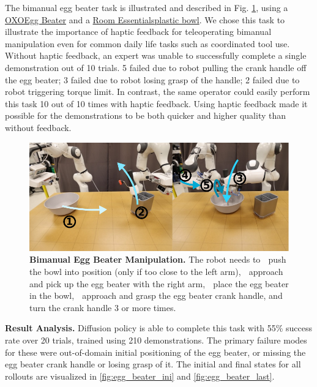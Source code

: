 The bimanual egg beater task is illustrated and described in Fig. \ref{fig:real_egg_beater}, using a
\href{https://www.oxo.com/egg-beater.html}{OXO\legalTM Egg Beater} and a
\href{https://www.target.com/p/114oz-plastic-serving-bowl-jet-gray-room-essentials-8482/-/A-86701588}{Room Essentials\legalTM plastic bowl}. We chose this task to illustrate the importance of haptic feedback for teleoperating bimanual manipulation even for common daily life tasks such as coordinated tool use. Without haptic feedback, an expert was unable to successfully complete a single demonstration out of 10 trials. 5 failed due to robot pulling the crank handle off the egg beater; 3 failed due to robot losing grasp of the handle; 2 failed due to robot triggering torque limit. In contrast, the same operator could easily perform this task 10 out of 10 times with haptic feedback. Using haptic feedback made it possible for the demonstrations to be both quicker and higher quality than without feedback.

\begin{figure}[t]
\centering
\includegraphics[width=\linewidth]{figure/real_egg_beater_setup_compressed.pdf}
\caption{\textbf{Bimanual Egg Beater Manipulation. } 
\label{fig:real_egg_beater}
The robot needs to
\textcircled{} push the bowl into position (only if too close to the left arm),
\textcircled{} approach and pick up the egg beater with the right arm,
\textcircled{} place the egg beater in the bowl,
\textcircled{} approach and grasp the egg beater crank handle, and
\textcircled{} turn the crank handle 3 or more times.
}
\vspace{-4mm}
\end{figure}

\textbf{Result Analysis.} Diffusion policy is able to complete this task with 55\% success rate over 20 trials, trained using 210 demonstrations. The primary failure modes for these were out-of-domain initial positioning of the egg beater, or missing the egg beater crank handle or losing grasp of it. The initial and final states for all rollouts are visualized in \ref{fig:egg_beater_ini} and \ref{fig:egg_beater_last}.




